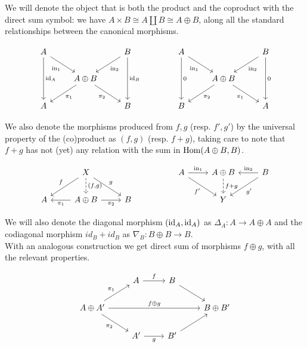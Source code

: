 We will denote the object that is both the product and the coproduct with the direct sum symbol: we have $A\times B \cong A \amalg B \cong A \oplus B$, along all the standard relationships between the canonical morphisms.

\[\begin{tikzcd}
	A && B && A && B \\
	& {A \oplus B} &&&& {A \oplus B} \\
	A && B && B && A
	\arrow["{\inn_1}"', from=1-1, to=2-2]
	\arrow["{\id_A}", from=1-1, to=3-1]
	\arrow["{\inn_2}", from=1-3, to=2-2]
	\arrow["{\id_B}", from=1-3, to=3-3]
	\arrow["{\inn_1}"', from=1-5, to=2-6]
	\arrow["0", from=1-5, to=3-5]
	\arrow["{\inn_2}", from=1-7, to=2-6]
	\arrow["0", from=1-7, to=3-7]
	\arrow["{\pi_1}", from=2-2, to=3-1]
	\arrow["{\pi_2}"', from=2-2, to=3-3]
	\arrow["{\pi_2}", from=2-6, to=3-5]
	\arrow["{\pi_1}"', from=2-6, to=3-7]
\end{tikzcd}\]

We also denote the morphisms produced from $f,g$ (resp. $f',g'$) by the universal property of the (co)product as $(f,g)$ (resp. $f+g$), taking care to note that $f+g$ has not (yet) any relation with the sum in $\mathrm{Hom}(A\oplus B, B)$. 

\[\begin{tikzcd}
	& X &&& A & {A\oplus B} & B \\
	A & {A \oplus B} & B &&& Y
	\arrow["f"', from=1-2, to=2-1]
	\arrow["{(f,g)}", dashed, from=1-2, to=2-2]
	\arrow["g", from=1-2, to=2-3]
	\arrow["{\inn_1}", from=1-5, to=1-6]
	\arrow["{f'}"', from=1-5, to=2-6]
	\arrow["{f+g}", dashed, from=1-6, to=2-6]
	\arrow["{\inn_2}"', from=1-7, to=1-6]
	\arrow["{g'}", from=1-7, to=2-6]
	\arrow["{\pi_1}", from=2-2, to=2-1]
	\arrow["{\pi_2}"', from=2-2, to=2-3]
\end{tikzcd}\]

We will also denote the diagonal morphism $(\mathrm{id}_A, \mathrm{id}_A)$ as $\Delta_A \colon A \longrightarrow A \oplus A$ and the codiagonal morphism $id_B + id_B$ as $\nabla_B \colon B\oplus B \longrightarrow B$.\\
With an analogous construction we get direct sum of morphisms $f \oplus g$, with all the relevant properties.


\[\begin{tikzcd}
	& A & B \\
	{A\oplus A'} &&& {B\oplus B'} \\
	& {A'} & {B'}
	\arrow["f", from=1-2, to=1-3]
	\arrow[from=1-3, to=2-4]
	\arrow["{\pi_1}", from=2-1, to=1-2]
	\arrow["{f \oplus g}", from=2-1, to=2-4]
	\arrow["{\pi_2}"', from=2-1, to=3-2]
	\arrow["g"', from=3-2, to=3-3]
	\arrow[from=3-3, to=2-4]
\end{tikzcd}\]


